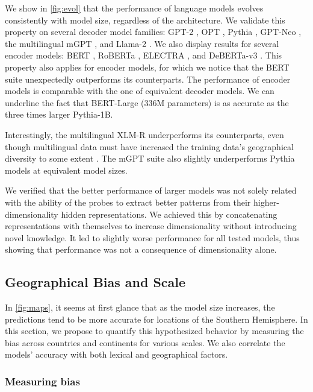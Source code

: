 We show in \autoref{fig:evol} that the performance of language models evolves consistently with model size, regardless of the architecture. We validate this property on several decoder model families: GPT-2 \citep{gpt2}, OPT \citep{zhang2022opt}, Pythia \citep{pythia}, GPT-Neo \citep{gpt-neo}, the multilingual mGPT \citep{shliazhko2023mgpt}, and Llama-2 \citep{touvron2023llama}. We also display results for several encoder models: BERT \citep{devlin-etal-2019-bert,turc2020wellread}, RoBERTa \citep{roberta}, ELECTRA \citep{electra}, and DeBERTa-v3 \citep{deberta}. This property also applies for encoder models, for which we notice that the BERT suite unexpectedly outperforms its counterparts. The performance of encoder models is comparable with the one of equivalent decoder models. We can underline the fact that BERT-Large (336M parameters) is as accurate as the three times larger Pythia-1B.

Interestingly, the multilingual XLM-R \citep{conneau2020unsupervised} underperforms its counterparts, even though multilingual data must have increased the training data's geographical diversity to some extent \citep{faisal-anastasopoulos-2021-investigating}. The mGPT suite also slightly underperforms Pythia models at equivalent model sizes.

We verified that the better performance of larger models was not solely related with the ability of the probes to extract better patterns from their higher-dimensionality hidden representations. We achieved this by concatenating representations with themselves to increase dimensionality without introducing novel knowledge. It led to slightly worse performance for all tested models, thus showing that performance was not a consequence of dimensionality alone.

\subsection{Geographical Bias and Scale}

In \autoref{fig:maps}, it seems at first glance that as the model size increases, the predictions tend to be more accurate for locations of the Southern Hemisphere. In this section, we propose to quantify this hypothesized behavior by measuring the bias across countries and continents for various scales. We also correlate the models' accuracy with both lexical and geographical factors.

\subsubsection{Measuring bias}

